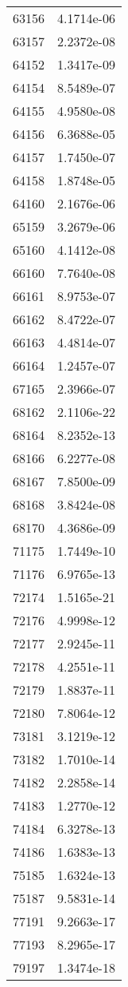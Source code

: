 \begin{table}[h!]
\begin{tabular}{|| c || c |}
63156 & 4.1714e-06 \\
63157 & 2.2372e-08 \\
64152 & 1.3417e-09 \\
64154 & 8.5489e-07 \\
64155 & 4.9580e-08 \\
64156 & 6.3688e-05 \\
64157 & 1.7450e-07 \\
64158 & 1.8748e-05 \\
64160 & 2.1676e-06 \\
65159 & 3.2679e-06 \\
65160 & 4.1412e-08 \\
66160 & 7.7640e-08 \\
66161 & 8.9753e-07 \\
66162 & 8.4722e-07 \\
66163 & 4.4814e-07 \\
66164 & 1.2457e-07 \\
67165 & 2.3966e-07 \\
68162 & 2.1106e-22 \\
68164 & 8.2352e-13 \\
68166 & 6.2277e-08 \\
68167 & 7.8500e-09 \\
68168 & 3.8424e-08 \\
68170 & 4.3686e-09 \\
71175 & 1.7449e-10 \\
71176 & 6.9765e-13 \\
72174 & 1.5165e-21 \\
72176 & 4.9998e-12 \\
72177 & 2.9245e-11 \\
72178 & 4.2551e-11 \\
72179 & 1.8837e-11 \\
72180 & 7.8064e-12 \\
73181 & 3.1219e-12 \\
73182 & 1.7010e-14 \\
74182 & 2.2858e-14 \\
74183 & 1.2770e-12 \\
74184 & 6.3278e-13 \\
74186 & 1.6383e-13 \\
75185 & 1.6324e-13 \\
75187 & 9.5831e-14 \\
77191 & 9.2663e-17 \\
77193 & 8.2965e-17 \\
79197 & 1.3474e-18 \\

\end{tabular}
\end{table}
